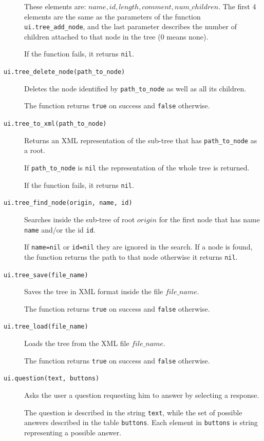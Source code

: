 \documentclass[11pt]{report}
\begin{document}
\begin{description}
{  These elements are: ${name, id, length, comment, num\_children}$. 
  The first 4 elements are the same as the parameters of the function 
  \texttt{ui.tree\_add\_node}, and the last parameter describes the number of 
  children attached to that node in the tree (0 means none).

  If the function fails, it returns \texttt{nil}.
}

\item[\texttt{ui.tree\_delete\_node(path\_to\_node)}]
{
  Deletes the node identified by \texttt{path\_to\_node} as well as all its 
  children.
	  
  The function returns \texttt{true} on success and \texttt{false} otherwise.
}

\item[\texttt{ui.tree\_to\_xml(path\_to\_node)}]
{
  Returns an XML representation of the sub-tree that has \texttt{path\_to\_node} 
  as a root.
	  
  If \texttt{path\_to\_node} is \texttt{nil} the representation of the whole 
  tree is returned.
  
  If the function fails, it returns \texttt{nil}.
}

\item[\texttt{ui.tree\_find\_node(origin, name, id)}]
{
  Searches inside the sub-tree of root $origin$ for the first node that has 
  name \texttt{name} and/or the id \texttt{id}.

  If \texttt{name=nil} or \texttt{id=nil} they are ignored in the search.
  If a node is found, the function returns the path to that node otherwise 
  it returns \texttt{nil}.
}

\item[\texttt{ui.tree\_save(file\_name)}]
{
  Saves the tree in XML format inside the file $file\_name$.

  The function returns \texttt{true} on success and \texttt{false} otherwise.
}

\item[\texttt{ui.tree\_load(file\_name)}]
{
  Loads the tree from the XML file $file\_name$.

  The function returns \texttt{true} on success and \texttt{false} otherwise.
}

\item[\texttt{ui.question(text, buttons)}]
{
  Asks the user a question requesting him to answer by selecting a response.

  The question is described in the string \texttt{text}, while the set of 
  possible answers described in the table \texttt{buttons}. 
  Each element in \texttt{buttons} is string representing a possible answer.
  
}
\end{description}
\end{document}
